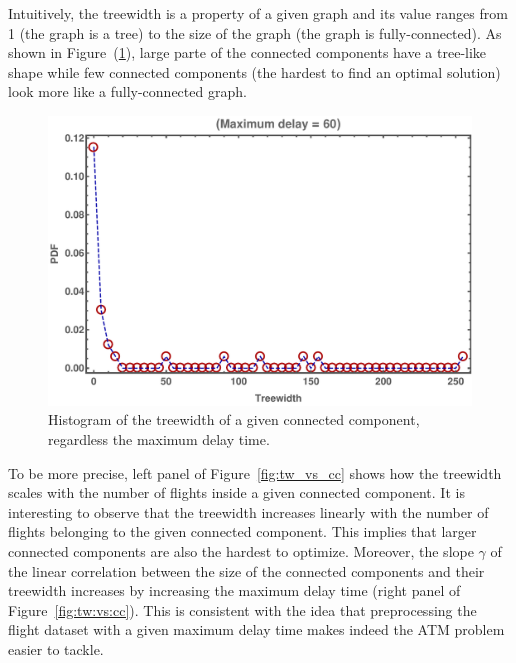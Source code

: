 Intuitively, the treewidth is a property of a given graph and its value ranges
from 1 (the graph is a tree) to the size of the graph (the graph is
fully-connected). As shown in Figure~(\ref{fig:hist_tw}), large parte of the
connected components have a tree-like shape while few connected components (the
hardest to find an optimal solution) look more like a fully-connected graph.

\begin{figure}
  \includegraphics[width=\columnwidth]{pics/instances/treewidth_histogram.pdf}
  \caption{\label{fig:hist_tw}Histogram of the treewidth of a given connected
  component, regardless the maximum delay time.}
\end{figure}

To be more precise, left panel of Figure~\ref{fig:tw_vs_cc} shows how the
treewidth scales with the number of flights inside a given connected component.
It is interesting to observe that the treewidth increases linearly with the
number of flights belonging to the given connected component. This implies that
larger connected components are also the hardest to optimize. Moreover, the
slope $\gamma$ of the linear correlation between the size of the connected
components and their treewidth increases by increasing the maximum delay time
(right panel of Figure~\ref{fig:tw:vs:cc}). This is consistent with the
idea that preprocessing the flight dataset with a given maximum delay time makes
indeed the ATM problem easier to tackle.

